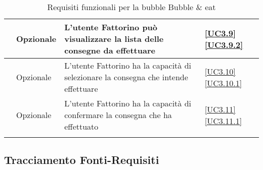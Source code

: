 \begin{longtable}{|P{1.5cm}|P{2.5cm}|P{6.5cm}|P{2.5cm}|}
	\hline \RequisitoOpF\label{L50} & Opzionale & L'utente Fattorino può visualizzare la lista delle consegne da effettuare & \ref{UC3.9} \ref{UC3.9.2} \\
	\hline \RequisitoOpF\label{L51} & Opzionale & L'utente Fattorino ha la capacità di selezionare la consegna che intende effettuare & \ref{UC3.10} \ref{UC3.10.1} \\
	\hline \RequisitoOpF\label{L52} & Opzionale & L'utente Fattorino ha la capacità di confermare la consegna che ha effettuato & \ref{UC3.11} \ref{UC3.11.1} \\
	\hline
	\caption{Requisiti funzionali per la bubble Bubble \& eat}
\end{longtable}

\subsection{Tracciamento Fonti-Requisiti}

